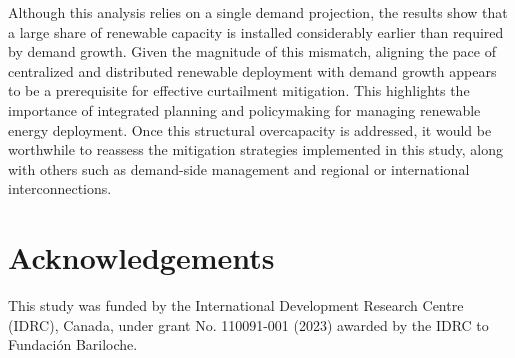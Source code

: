 \documentclass[a4paper,fleqn]{cas-dc}
\begin{document}
Although this analysis relies on a single demand projection, the results show that a large share of renewable capacity is installed considerably earlier than required by demand growth. Given the magnitude of this mismatch, aligning the pace of centralized and distributed renewable deployment with demand growth appears to be a prerequisite for effective curtailment mitigation. This highlights the importance of integrated planning and policymaking for managing renewable energy deployment. Once this structural overcapacity is addressed, it would be worthwhile to reassess the mitigation strategies implemented in this study, along with others such as demand-side management and regional or international interconnections.

\section{Acknowledgements}

This study was funded by the International Development Research Centre (IDRC), Canada, under grant No. 110091-001 (2023) awarded by the IDRC to Fundación Bariloche.

\clearpage %





\section{}\label{}

\printcredits

%





\end{document}
